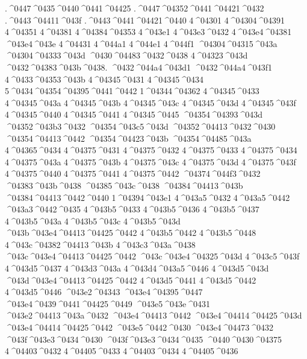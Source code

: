 { .^^^^0447^^^^0435^^^^0440^^^^0441^^^^04425
 .^^^^0447^^^^04352^^^^0441^^^^04421^^^^0432
 .^^^^0443^^^^04411^^^^043f
 .^^^^0443^^^^0441^^^^04421^^^^0440
4^^^^04301
4^^^^04304^^^^04391
4^^^^04351
4^^^^04381
4^^^^04384^^^^04353
4^^^^043e1
4^^^^043e3^^^^0432
4^^^^043e4^^^^04381
^^^^043e4^^^^043e
4^^^^04431
4^^^^044a1
4^^^^044e1
4^^^^044f1
^^^^04304^^^^04315^^^^043a
^^^^04304^^^^04333^^^^043d
^^^^0430^^^^04483^^^^0432^^^^0438
4^^^^04323^^^^043d
^^^^0432^^^^04383^^^^043b^^^^0438.
^^^^0432^^^^044a4^^^^043d1
^^^^0432^^^^044a4^^^^043f1
4^^^^0433^^^^04353^^^^043b
4^^^^04345^^^^0431
4^^^^04345^^^^0434
5^^^^0434^^^^04354^^^^04395^^^^0441^^^^0442
1^^^^04344^^^^04362
4^^^^04345^^^^0433
4^^^^04345^^^^043a
4^^^^04345^^^^043b
4^^^^04345^^^^043c
4^^^^04345^^^^043d
4^^^^04345^^^^043f
4^^^^04345^^^^0440
4^^^^04345^^^^0441
4^^^^04345^^^^0445
^^^^04354^^^^04393^^^^043d
^^^^04352^^^^043b3^^^^0432
^^^^04354^^^^043c5^^^^043d
^^^^04352^^^^04413^^^^0432^^^^0430
^^^^04354^^^^04413^^^^0442
^^^^04354^^^^04423^^^^043b
^^^^04354^^^^04485^^^^043a
4^^^^04365^^^^0434
4^^^^04375^^^^0431
4^^^^04375^^^^0432
4^^^^04375^^^^0433
4^^^^04375^^^^0434
4^^^^04375^^^^043a
4^^^^04375^^^^043b
4^^^^04375^^^^043c
4^^^^04375^^^^043d
4^^^^04375^^^^043f
4^^^^04375^^^^0440
4^^^^04375^^^^0441
4^^^^04375^^^^0442
^^^^04374^^^^044f3^^^^0432
^^^^04383^^^^043b^^^^0438
^^^^04385^^^^043c^^^^0438
^^^^04384^^^^04413^^^^043b
^^^^04384^^^^04413^^^^0442^^^^0440
1^^^^04394^^^^043e1
4^^^^043a5^^^^0432
4^^^^043a5^^^^0442
^^^^043a3^^^^0442^^^^0435
4^^^^043b5^^^^0433
4^^^^043b5^^^^0436
4^^^^043b5^^^^0437
4^^^^043b5^^^^043a
4^^^^043b5^^^^043c
4^^^^043b5^^^^043d
^^^^043b^^^^043e4^^^^04413^^^^04425^^^^0442
4^^^^043b5^^^^0442
4^^^^043b5^^^^0448
4^^^^043c^^^^04382^^^^04413^^^^043b
4^^^^043c3^^^^043a^^^^0438
^^^^043c^^^^043e4^^^^04413^^^^04425^^^^0442
^^^^043c^^^^043e4^^^^04325^^^^043d
4^^^^043c5^^^^043f
4^^^^043d5^^^^0437
4^^^^043d3^^^^043a
4^^^^043d4^^^^043a5^^^^0446
4^^^^043d5^^^^043d
^^^^043d^^^^043e4^^^^04413^^^^04425^^^^0442
4^^^^043d5^^^^0441
4^^^^043d5^^^^0442
4^^^^043d5^^^^0446
^^^^043e2^^^^04343
^^^^043e4^^^^04395^^^^0447
^^^^043e4^^^^0439^^^^0441^^^^04425^^^^0449
^^^^043e5^^^^043e^^^^0431
^^^^043e2^^^^04413^^^^043a^^^^0432
^^^^043e4^^^^04413^^^^0442
^^^^043e4^^^^04414^^^^04425^^^^043d
^^^^043e4^^^^04414^^^^04425^^^^0442
^^^^043e5^^^^0442^^^^0430
^^^^043e4^^^^04473^^^^0432
^^^^043f^^^^043e3^^^^0434^^^^0430
^^^^043f^^^^043e3^^^^0434^^^^0435
^^^^0440^^^^0430^^^^04375
4^^^^04403^^^^0432
4^^^^04405^^^^0433
4^^^^04403^^^^0434
4^^^^04405^^^^0436
}
